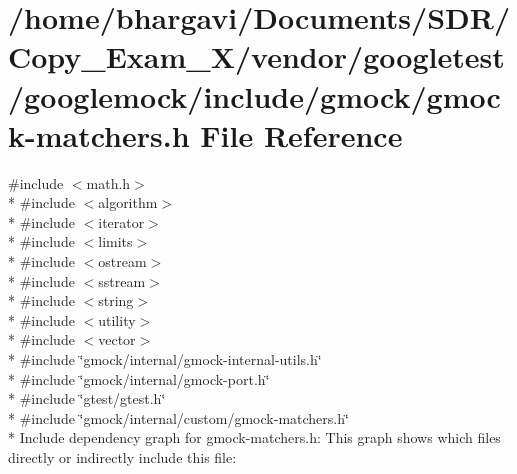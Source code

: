 \hypertarget{gmock-matchers_8h}{}\section{/home/bhargavi/\+Documents/\+S\+D\+R/\+Copy\+\_\+\+Exam\+\_\+X/vendor/googletest/googlemock/include/gmock/gmock-\/matchers.h File Reference}
\label{gmock-matchers_8h}
{\ttfamily \#include $<$math.\+h$>$}\\*
{\ttfamily \#include $<$algorithm$>$}\\*
{\ttfamily \#include $<$iterator$>$}\\*
{\ttfamily \#include $<$limits$>$}\\*
{\ttfamily \#include $<$ostream$>$}\\*
{\ttfamily \#include $<$sstream$>$}\\*
{\ttfamily \#include $<$string$>$}\\*
{\ttfamily \#include $<$utility$>$}\\*
{\ttfamily \#include $<$vector$>$}\\*
{\ttfamily \#include \char`\"{}gmock/internal/gmock-\/internal-\/utils.\+h\char`\"{}}\\*
{\ttfamily \#include \char`\"{}gmock/internal/gmock-\/port.\+h\char`\"{}}\\*
{\ttfamily \#include \char`\"{}gtest/gtest.\+h\char`\"{}}\\*
{\ttfamily \#include \char`\"{}gmock/internal/custom/gmock-\/matchers.\+h\char`\"{}}\\*
Include dependency graph for gmock-\/matchers.h\+:
This graph shows which files directly or indirectly include this file\+:
